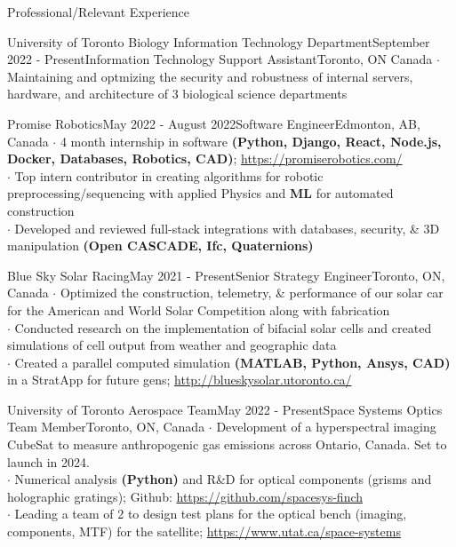 \documentclass[UTF8]{resume} %
\begin{document}
\begin{rSection}{Professional/Relevant Experience}
\begin{rSubsection}{University of Toronto Biology Information Technology Department}{September 2022 - Present}{Information Technology Support Assistant}{Toronto, ON Canada}
    $\cdot$ Maintaining and optmizing the security and robustness of internal servers, hardware, and architecture of 3 biological science departments
\end{rSubsection}
\begin{rSubsection}{Promise Robotics}{May 2022 - August 2022}{Software Engineer}{Edmonton, AB, Canada}
    $\cdot$ 4 month internship in software \textbf{(Python, Django, React, Node.js, Docker, Databases, Robotics, CAD)}; \href{https://promiserobotics.com/}{https://promiserobotics.com/}\\
    $\cdot$ Top intern contributor in creating algorithms for robotic preprocessing/sequencing with applied Physics and \textbf{ML} for automated construction  \\
    $\cdot$ Developed and reviewed full-stack integrations with databases, security, \& 3D manipulation \textbf{(Open CASCADE, Ifc, Quaternions)}
\end{rSubsection}
\begin{rSubsection}{Blue Sky Solar Racing}{May 2021 - Present}{Senior Strategy Engineer}{Toronto, ON, Canada}
    $\cdot$ Optimized the construction, telemetry, \& performance of our solar car for the American and World Solar Competition along with fabrication\\
    $\cdot$ Conducted research on the implementation of bifacial solar cells and created simulations of cell output from weather and geographic data\\
    $\cdot$ Created a parallel computed simulation \textbf{(MATLAB, Python, Ansys, CAD)} in a StratApp for future gens; \href{http://blueskysolar.utoronto.ca/}{http://blueskysolar.utoronto.ca/}
\end{rSubsection}
\begin{rSubsection}{University of Toronto Aerospace Team}{May 2022 - Present}{Space Systems Optics Team Member}{Toronto, ON, Canada}
    $\cdot$ Development of a hyperspectral imaging CubeSat to measure anthropogenic gas emissions across Ontario, Canada. Set to launch in 2024. \\
    $\cdot$ Numerical analysis \textbf{(Python)} and R\&D for optical components (grisms and holographic gratings); Github: \href{https://github.com/spacesys-finch}{https://github.com/spacesys-finch}\\
    $\cdot$ Leading a team of 2 to design test plans for the optical bench (imaging, components, MTF) for the satellite; \href{https://www.utat.ca/space-systems}{https://www.utat.ca/space-systems}
\end{rSubsection}
\end{rSection}
\end{document}
